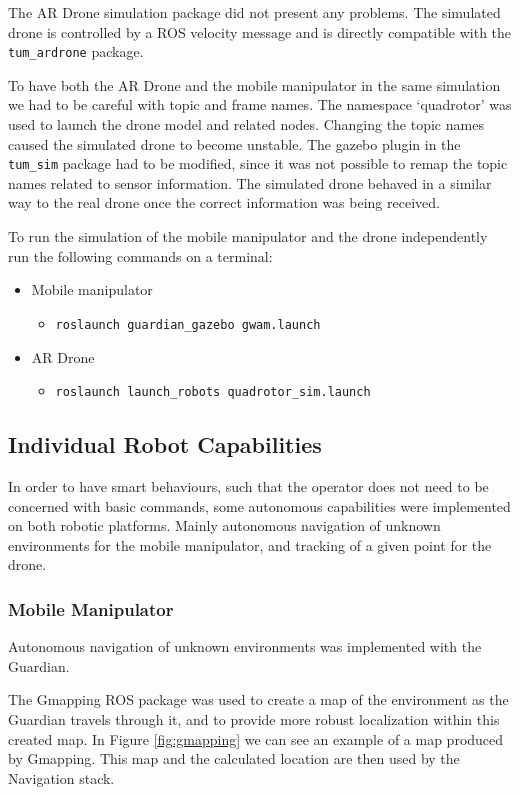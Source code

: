 \documentclass[11pt,a4paper]{article}
\begin{document}
The AR Drone simulation package did not present any problems. The simulated drone is controlled by a ROS velocity message and is directly compatible with the \verb!tum_ardrone! package.  

To have both the AR Drone and the mobile manipulator in the same simulation
 we had to be careful with topic and frame names. The namespace `quadrotor' was used to launch the drone model and related nodes. Changing the topic names caused the simulated drone to become unstable. The  gazebo plugin in the \verb!tum_sim! package had to be modified, since it was not possible to remap the topic names related to sensor information. The simulated drone behaved in a similar way to the real drone once the correct information was being received.
 
To run the simulation of the mobile manipulator and the drone independently run the following commands on a terminal:

\begin{itemize}
	\item Mobile manipulator
	\begin{itemize}
		\item \verb!roslaunch guardian_gazebo gwam.launch!
	\end{itemize}
	\item AR Drone
	\begin{itemize}
		\item \verb!roslaunch launch_robots quadrotor_sim.launch!
	\end{itemize}
\end{itemize}

\subsection{Individual Robot Capabilities}
In order to have smart behaviours, such that the operator does not need to be concerned with basic commands, some autonomous capabilities were implemented on both robotic platforms. Mainly autonomous navigation of unknown environments for the mobile manipulator, and tracking of a given point for the drone.

\subsubsection{Mobile Manipulator}
Autonomous navigation of unknown environments was implemented with the Guardian.

The Gmapping ROS package was used to create a map of the environment as the Guardian travels through it, and to provide more robust localization within this created map. In Figure \ref{fig:gmapping} we can see an example of a map produced by Gmapping. This map and the calculated location are then used by the Navigation stack.
\end{document}
